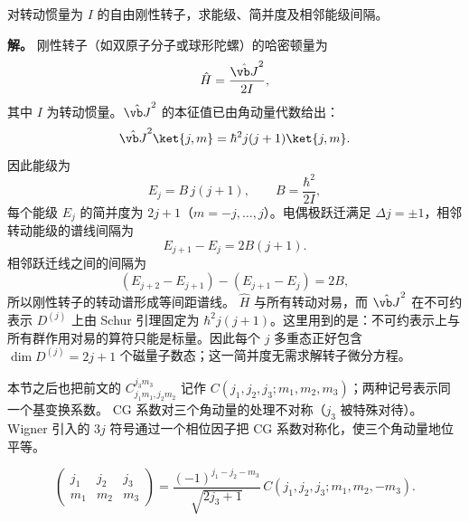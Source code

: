 \begin{example}[{刚性转子的能级}]
对转动惯量为 $I$ 的自由刚性转子，求能级、简并度及相邻能级间隔。

\textbf{解。} 刚性转子（如双原子分子或球形陀螺）的哈密顿量为
\[
\hat H=\frac{\hat{\vb J}^2}{2I},
\]
其中 $I$ 为转动惯量。$\hat{\vb J}^2$ 的本征值已由角动量代数给出：
\[
\hat{\vb J}^2\ket{j,m}=\hbar^2 j(j+1)\ket{j,m}.
\]
因此能级为
\[
E_j=B\,j(j+1),
\qquad
B=\frac{\hbar^2}{2I},
\]
每个能级 $E_j$ 的简并度为 $2j+1$（$m=-j,\dots,j$）。电偶极跃迁满足
$\Delta j=\pm1$，相邻转动能级的谱线间隔为
\[
E_{j+1}-E_j=2B(j+1).
\]
相邻跃迁线之间的间隔为
\[
(E_{j+2}-E_{j+1})-(E_{j+1}-E_j)=2B,
\]
所以刚性转子的转动谱形成等间距谱线。
$\hat H$ 与所有转动对易，而 $\hat{\vb J}^2$ 在不可约表示 $D^{(j)}$ 上由
Schur 引理固定为 $\hbar^2j(j+1)$。这里用到的是：不可约表示上与所有群作用对易的算符只能是标量。因此每个 $j$ 多重态正好包含
$\dim D^{(j)}=2j+1$ 个磁量子数态；这一简并度无需求解转子微分方程。
\end{example}
本节之后也把前文的 $C^{j_3m_3}_{j_1m_1,j_2m_2}$ 记作
$C(j_1,j_2,j_3;m_1,m_2,m_3)$；两种记号表示同一个基变换系数。
CG 系数对三个角动量的处理不对称（$j_3$ 被特殊对待）。Wigner 引入的 $3j$ 符号通过一个相位因子把 CG 系数对称化，使三个角动量地位平等。
\begin{definition}[Wigner 3j 符号]
\[
\begin{pmatrix}j_1&j_2&j_3\\m_1&m_2&m_3\end{pmatrix}
=\frac{(-1)^{j_1-j_2-m_3}}{\sqrt{2j_3+1}}\,
C(j_1,j_2,j_3;m_1,m_2,-m_3).
\]
\label{def:3j-symbol}
\end{definition}
